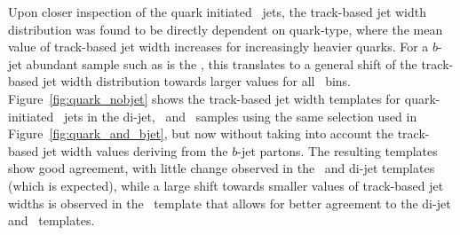 	Upon closer inspection of the quark initiated \ftau\ jets, the track-based jet width distribution was found to be directly dependent on quark-type, where the mean value of track-based jet width increases for increasingly heavier quarks. 
	For a $b$-jet abundant sample such as is the \ttbar, this translates to a general shift of the track-based jet width distribution towards larger values for all \pt\ bins.
	Figure~\ref{fig:quark_nobjet} shows the track-based jet width templates for quark-initiated \ftau\ jets in the di-jet, \Zjets\ and \ttbar\ samples using the same selection used in Figure~\ref{fig:quark_and_bjet}, but now without taking into account the track-based jet width values deriving from the $b$-jet partons.
	The resulting templates show good agreement, with little change observed in the \Zjets\ and di-jet templates (which is expected), while a large shift towards smaller values of track-based jet widths is observed in the \ttbar\ template that allows for better agreement to the di-jet and \Zjets\ templates. 
